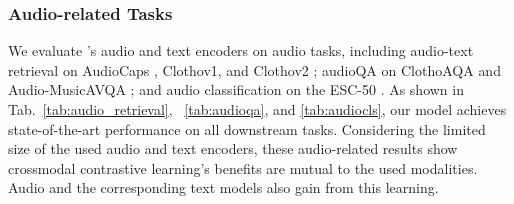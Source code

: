 \subsubsection{Audio-related Tasks} \label{sec:audio}
We evaluate {\modelname}'s audio and text encoders on audio tasks, including audio-text retrieval on AudioCaps \cite{kim2019audiocaps}, Clothov1, and Clothov2 \cite{drossos2020clotho}; audioQA on ClothoAQA \cite{lipping2022clotho} and Audio-MusicAVQA \cite{behera2023aquallm}; and audio classification on the ESC-50 \cite{piczak2015esc}. As shown in Tab.~\ref{tab:audio_retrieval}, ~\ref{tab:audioqa}, and \ref{tab:audiocls}, our model achieves state-of-the-art performance on all downstream tasks. Considering the limited size of the used audio and text encoders, these audio-related results show crossmodal contrastive learning's benefits are mutual to the used modalities. Audio and the corresponding text models also gain from this learning.

